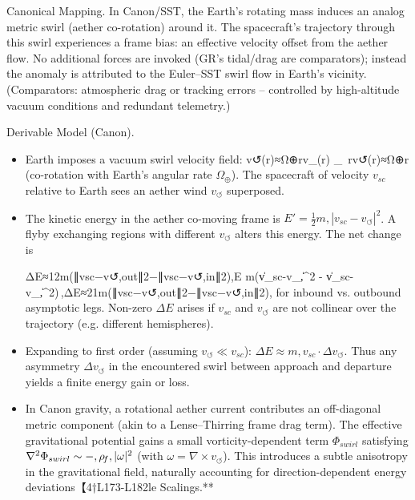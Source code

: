 \documentclass[11pt]{article}
\begin{document}
Canonical Mapping. In Canon/SST, the Earth’s rotating mass induces an analog metric swirl (aether co-rotation) around it. The spacecraft’s trajectory through this swirl experiences a frame bias: an effective velocity offset from the aether flow. No additional forces are invoked (GR’s tidal/drag are comparators); instead the anomaly is attributed to the Euler–SST swirl flow in Earth’s vicinity. (Comparators: atmospheric drag or tracking errors – controlled by high-altitude vacuum conditions and redundant telemetry.)


Derivable Model (Canon).


\begin{itemize}

\item 
Earth imposes a vacuum swirl velocity field: v↺(r)≈Ω⊕rv_{\circlearrowleft}(r) \approx \Omega_{\oplus}\, rv↺(r)≈Ω⊕r (co-rotation with Earth’s angular rate $\Omega_{\oplus}$). The spacecraft of velocity $v_{sc}$ relative to Earth sees an aether wind $v_{\circlearrowleft}$ superposed.




\item 
The kinetic energy in the aether co-moving frame is $E' = \frac{1}{2} m,|v_{sc} - v_{\circlearrowleft}|^2$. A flyby exchanging regions with different $v_{\circlearrowleft}$ alters this energy. The net change is


ΔE≈12m(∥vsc−v↺,out∥2−∥vsc−v↺,in∥2),\Delta E \;\approx\;  m\Big(\|v_{sc}-v_{\circlearrowleft,}\|^2 - \|v_{sc}-v_{\circlearrowleft,}\|^2\Big)\,,ΔE≈21m(∥vsc−v↺,out∥2−∥vsc−v↺,in∥2),
for inbound vs. outbound asymptotic legs. Non-zero $\Delta E$ arises if $v_{sc}$ and $v_{\circlearrowleft}$ are not collinear over the trajectory (e.g. different hemispheres).




\item 
Expanding to first order (assuming $v_{\circlearrowleft} \ll v_{sc}$): $\Delta E \approx m,v_{sc}\cdot\Delta v_{\circlearrowleft}$. Thus any asymmetry $\Delta v_{\circlearrowleft}$ in the encountered swirl between approach and departure yields a finite energy gain or loss.




\item 
In Canon gravity, a rotational aether current contributes an off-diagonal metric component (akin to a Lense–Thirring frame drag term). The effective gravitational potential gains a small vorticity-dependent term $\Phi_{swirl}$ satisfying $\nabla^2 \Phi_{swirl} \sim -,\rho_{\!f},|\omega|^2$ (with $\omega = \nabla\times v_{\circlearrowleft}$). This introduces a subtle anisotropy in the gravitational field, naturally accounting for direction-dependent energy deviations【4†L173-L182le Scalings.**





\end{itemize}
\end{document}
